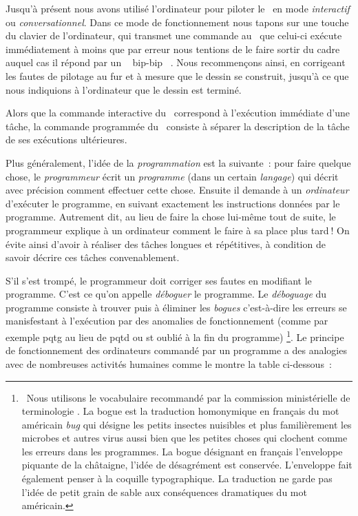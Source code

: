 
Jusqu'à présent nous avons utilisé l'ordinateur pour
piloter le \robot\ en mode {\em interactif} ou
{\em conversationnel}. Dans ce mode de fonctionnement 
nous tapons sur une touche du clavier de l'ordinateur, qui transmet
une commande au \robot\ que celui-ci exécute immédiatement à moins que par erreur
nous tentions de le faire sortir du cadre auquel cas il répond par
un \raisebox{0.25ex}{$\scriptscriptstyle \boldmath\ll$}~%
bip-bip%
~\raisebox{0.25ex}{$\scriptscriptstyle \boldmath\gg$}. 
Nous recommençons ainsi, en corrigeant les fautes de pilotage au fur et à mesure que
le dessin se construit, jusqu'à ce que nous
indiquions à l'ordinateur que le dessin est terminé. 

\smallskip

Alors que la commande interactive du \robot\ correspond à l'exécution
im\-mé\-dia\-te d'une tâche, la commande programmée du \robot\ consiste
à séparer la description de la tâche de ses exécutions ultérieures. 

\smallskip

Plus
généralement, l'idée de la {\em programmation} est la suivante~: 
pour faire quelque chose, le {\em programmeur} écrit un {\em programme}
(dans un certain {\em langage}) qui décrit avec précision comment 
effectuer cette chose. Ensuite il demande à un {\em ordinateur} d'exécuter
le programme, en suivant exactement les instructions données par le
programme. Autrement dit, au lieu de faire la chose
lui-même tout de suite, le programmeur explique à un ordinateur comment 
le faire à sa place plus tard$\:$! On évite ainsi d'avoir à réaliser
des tâches longues et répétitives, à condition de savoir 
décrire ces tâches con\-ve\-na\-ble\-ment.

\smallskip

S'il s'est trompé, le programmeur
doit corriger ses fautes en modifiant le programme. C'est ce qu'on appelle 
{\em déboguer} le programme. Le {\em déboguage}
du programme consiste à trouver puis à éliminer les {\em bogues} c'est-à-dire les 
erreurs se manisfestant à l'exécution par des anomalies de fonctionnement (comme par 
exemple {\idt pqtg} au lieu de {\idt pqtd} ou {\idt st} oublié à la fin du programme)%
\footnote{\ Nous utilisons le vocabulaire recommandé par la commission
ministérielle de ter\-mi\-no\-lo\-gie \cite{terminologie-info}. La bogue est
la traduction homonymique en français du mot américain {\em bug} qui 
désigne les petits insectes nuisibles et plus familièrement les microbes 
et autres virus aussi bien que les petites choses qui clochent comme les erreurs 
dans les programmes. La bogue désignant en français l'enveloppe piquante
de la châtaigne, l'idée de désagrément est conservée. L'enveloppe fait
également penser à la coquille typographique. La traduction
ne garde pas l'idée de petit grain de sable aux conséquences dramatiques
du mot américain.}.
Le principe de fonctionnement des ordinateurs commandé par un programme a des 
analogies avec de nombreuses activités humaines
comme le montre la table \hbox{ci-dessous~:}

